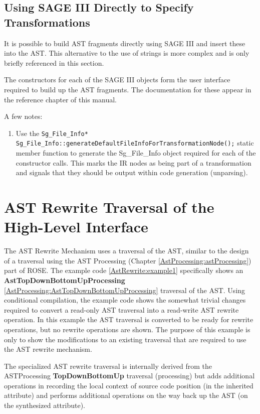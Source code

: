 \subsection{Using SAGE III Directly to Specify Transformations}

   It is possible to build AST fragments directly using SAGE III and insert these into
the AST.  This alternative to the use of strings is more complex and is only
briefly referenced in this section.

   The constructors for each of the SAGE III objects form the user interface required to
build up the AST fragments.  The documentation for these appear in the reference chapter
of this manual.

A few notes:
\begin{enumerate}
 \item Use the {\tt Sg\_File\_Info* Sg\_File\_Info::generateDefaultFileInfoForTransformationNode();} 
static member function to generate the Sg\_File\_Info object required for each of the
constructor calls.  This marks the IR nodes as being part of a transformation and signals
that they should be output within code generation (unparsing).
\end{enumerate}


\section{AST Rewrite Traversal of the High-Level Interface}

    The AST Rewrite Mechanism uses a traversal of the AST, similar to the
design of a traversal using the AST Processing 
(Chapter \ref{AstProcessing:astProcessing}) part of ROSE.
The example code \ref{AstRewrite:example1} specifically shows an {\bf AstTopDownBottomUpProcessing}
\ref{AstProcessing:AstTopDownBottomUpProcessing}
traversal of the AST.  Using conditional compilation,
the example code shows the somewhat trivial changes required to convert
a read-only AST traversal into a read-write AST rewrite operation. In this
example the AST traversal is converted to be ready for rewrite operations, but
no rewrite operations are shown. The purpose of this example is only to show the
modifications to an existing traversal that are required to use the AST rewrite
mechanism.

   The specialized AST rewrite traversal is internally derived from the ASTProcessing
{\bf TopDownBottomUp} traversal (processing) but adds additional operations
in recording the local context of source code position (in the inherited attribute)
and performs additional operations on the way back up the AST (on the synthesized attribute).


